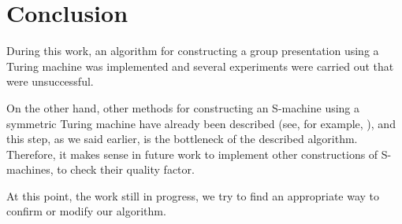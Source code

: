 \documentclass[conference]{IEEEtran}
\theoremstyle{definition}
\begin{document}
\section{Conclusion}

During this work, an algorithm for constructing a group presentation 
using a Turing machine was implemented and several experiments were 
carried out that were unsuccessful.

On the other hand, other methods for constructing an S-machine 
using a symmetric Turing machine have already been described 
(see, for example, \cite{SpaceFunc}), and this step, as we said earlier, 
is the bottleneck of the described algorithm. 
Therefore, it makes sense in future work to implement other constructions 
of S-machines, to check their quality factor.

At this point, the work still in progress, we try to find an appropriate 
way to confirm or modify our algorithm.



\end{document}
